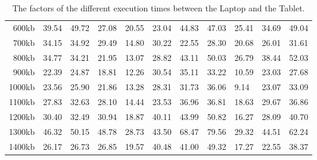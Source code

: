 \begin {table}[htpb]
\begin{tabular}{r|l|l|l|l|l|l|l|l|l|l}
600kb&39.54&49.72&27.08&20.55&23.04&44.83&47.03&25.41&34.69&49.04\\
700kb&34.15&34.92&29.49&14.80&30.22&22.55&28.30&20.68&26.01&31.61\\
800kb&34.77&34.21&21.95&13.07&28.82&43.11&50.03&26.79&38.44&52.03\\
900kb&22.39&24.87&18.81&12.26&30.54&35.11&33.22&10.59&23.03&27.68\\
1000kb&23.56&25.90&21.86&13.28&28.31&31.73&36.06&9.14&23.07&33.09\\
1100kb&27.83&32.63&28.10&14.44&23.53&36.96&36.81&18.63&29.67&36.86\\
1200kb&30.40&32.49&30.94&18.87&40.11&43.99&50.82&16.27&28.09&40.70\\
1300kb&46.32&50.15&48.78&28.73&43.50&68.47&79.56&29.32&44.51&62.24\\
1400kb&26.17&26.73&26.85&19.57&40.48&41.00&49.32&17.27&22.55&38.37\\
\end{tabular}
\caption{The factors of the different execution times between the Laptop and the Tablet.}
\label{tab:xmark-factors}
\end {table}
